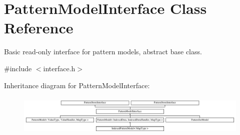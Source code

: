 \hypertarget{classPatternModelInterface}{}\section{Pattern\+Model\+Interface Class Reference}
\label{classPatternModelInterface}


Basic read-\/only interface for pattern models, abstract base class.  




{\ttfamily \#include $<$interface.\+h$>$}

Inheritance diagram for Pattern\+Model\+Interface\+:\begin{figure}[H]
\begin{center}
\leavevmode
\includegraphics[height=1.991111cm]{classPatternModelInterface}
\end{center}
\end{figure}
